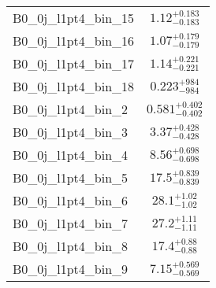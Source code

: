 \begin{tabular}{|l|c|}
B0\_0j\_l1pt4\_bin\_15 & $1.12^{+0.183}_{-0.183}$ \\
B0\_0j\_l1pt4\_bin\_16 & $1.07^{+0.179}_{-0.179}$ \\
B0\_0j\_l1pt4\_bin\_17 & $1.14^{+0.221}_{-0.221}$ \\
B0\_0j\_l1pt4\_bin\_18 & $0.223^{+984}_{-984}$ \\
B0\_0j\_l1pt4\_bin\_2 & $0.581^{+0.402}_{-0.402}$ \\
B0\_0j\_l1pt4\_bin\_3 & $3.37^{+0.428}_{-0.428}$ \\
B0\_0j\_l1pt4\_bin\_4 & $8.56^{+0.698}_{-0.698}$ \\
B0\_0j\_l1pt4\_bin\_5 & $17.5^{+0.839}_{-0.839}$ \\
B0\_0j\_l1pt4\_bin\_6 & $28.1^{+1.02}_{-1.02}$ \\
B0\_0j\_l1pt4\_bin\_7 & $27.2^{+1.11}_{-1.11}$ \\
B0\_0j\_l1pt4\_bin\_8 & $17.4^{+0.88}_{-0.88}$ \\
B0\_0j\_l1pt4\_bin\_9 & $7.15^{+0.569}_{-0.569}$ \\
\hline
\end{tabular}
